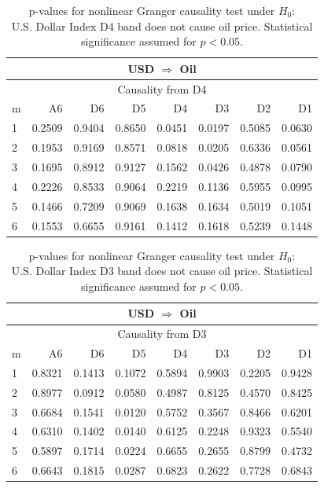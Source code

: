 %
%
\begin{table}[H]
\begin{center}
\begin{tabular}{l|r r r r r r r}
\hline\hline
\multicolumn{8}{c}{USD $\Rightarrow$ Oil}\\
\hline
\multicolumn{8}{c}{Causality from D4}\\
\hline\hline
m & A6 & D6 & D5 & D4 & D3 & D2 & D1 \\
\hline
1 & 0.2509 & 0.9404 & 0.8650 & \cellcolor{mygreen}0.0451 & \cellcolor{mygreen}0.0197 & 0.5085 & 0.0630 \\
2 & 0.1953 & 0.9169 & 0.8571 & 0.0818 & \cellcolor{mygreen}0.0205 & 0.6336 & 0.0561 \\
3 & 0.1695 & 0.8912 & 0.9127 & 0.1562 & \cellcolor{mygreen}0.0426 & 0.4878 & 0.0790 \\
4 & 0.2226 & 0.8533 & 0.9064 & 0.2219 & 0.1136 & 0.5955 & 0.0995 \\
5 & 0.1466 & 0.7209 & 0.9069 & 0.1638 & 0.1634 & 0.5019 & 0.1051 \\
6 & 0.1553 & 0.6655 & 0.9161 & 0.1412 & 0.1618 & 0.5239 & 0.1448 \\
\hline\hline
\end{tabular}
\caption{p-values for nonlinear Granger causality test under $H_0$:\\
U.S. Dollar Index D4 band does not cause oil price. Statistical significance assumed for $p<0.05$.}
\end{center}
\end{table}

%
%
\begin{table}[H]
\begin{center}
\begin{tabular}{l|r r r r r r r}
\hline\hline
\multicolumn{8}{c}{USD $\Rightarrow$ Oil}\\
\hline
\multicolumn{8}{c}{Causality from D3}\\
\hline\hline
m & A6 & D6 & D5 & D4 & D3 & D2 & D1 \\
\hline
1 & 0.8321 & 0.1413 & 0.1072 & 0.5894 & 0.9903 & 0.2205 & 0.9428 \\
2 & 0.8977 & 0.0912 & 0.0580 & 0.4987 & 0.8125 & 0.4570 & 0.8425 \\
3 & 0.6684 & 0.1541 & \cellcolor{mygreen}0.0120 & 0.5752 & 0.3567 & 0.8466 & 0.6201 \\
4 & 0.6310 & 0.1402 & \cellcolor{mygreen}0.0140 & 0.6125 & 0.2248 & 0.9323 & 0.5540 \\
5 & 0.5897 & 0.1714 & \cellcolor{mygreen}0.0224 & 0.6655 & 0.2655 & 0.8799 & 0.4732 \\
6 & 0.6643 & 0.1815 & \cellcolor{mygreen}0.0287 & 0.6823 & 0.2622 & 0.7728 & 0.6843 \\
\hline\hline
\end{tabular}
\caption{p-values for nonlinear Granger causality test under $H_0$:\\
U.S. Dollar Index D3 band does not cause oil price. Statistical significance assumed for $p<0.05$.}
\end{center}
\end{table}

